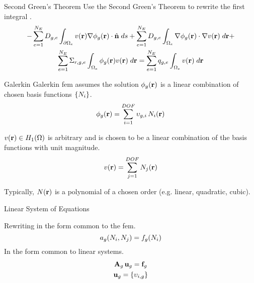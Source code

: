 \begin{frame}{Second Green's Theorem}
  Use the Second Green's Theorem to rewrite the first integral
  \cite{textbookli}.
  \begin{multline} 
    -\sum_{e=1}^{N_E} D_{g,e} \int_{\partial \Omega_e} v(\mathbf{r}) \mathbf{\nabla}
    \phi_g(\mathbf{r}) \cdot \hat{\mathbf{n}} \;ds + \sum_{e=1}^{N_E} 
      D_{g,e} \int_{\Omega_e} \mathbf{\nabla} \phi_g(\mathbf{r}) \cdot \mathbf{\nabla} v(\mathbf{r}) 
      \; d\mathbf{r} + \\
      \sum_{e=1}^{N_E} \Sigma_{r,g,e} \int_{\Omega_e} \phi_g(\mathbf{r}) v(\mathbf{r}) 
     \; d\mathbf{r} =
      \sum_{e=1}^{N_E} q_{g,e} \int_{\Omega_e} v(\mathbf{r}) \; d\mathbf{r}
  \end{multline}
\end{frame}

\begin{frame}{Galerkin }
  Galerkin \gls{fem} assumes the solution $\phi_g(\mathbf{r})$ is a linear
  combination of chosen basis functions $\{N_i\}$.
  \begin{equation} 
    \label{eq:linear_combination}
    \phi_g(\mathbf{r}) = \sum_{i=1}^{DOF} \upsilon_{g,i} \, N_i(\mathbf{r})
  \end{equation}

  $v(\mathbf{r}) \in H_1(\Omega)$ is arbitrary and is chosen to be a
  linear combination of the basis functions with unit magnitude.
  \begin{equation} 
    \label{eq:linear_superposition}
    v(\mathbf{r}) = \sum_{j=1}^{DOF} N_j(\mathbf{r})
  \end{equation}

  Typically, $N(\mathbf{r})$ is a polynomial of a chosen order (e.g. linear,
  quadratic, cubic).
\end{frame}

\begin{frame}{Linear System of Equations}

  Rewriting in the form common to the \gls{fem}.
  \begin{equation}
    \label{eq:fem_notation}
    a_g(N_i,N_j) = f_g(N_i)
  \end{equation}
  In the form common to linear systems.
  \begin{gather}
    \label{eq:matrix_notation}
    \mathbf{A}_g \, \mathbf{u}_g = \mathbf{f}_g \\
    \mathbf{u}_g = \{\upsilon_{i,g}\}
  \end{gather}
\end{frame}

